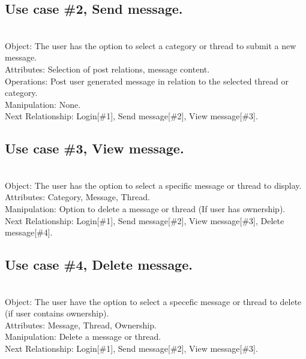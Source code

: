 \subsection{Use case \#2, Send message.}\\
Object: The user has the option to select a category or thread to submit a new message.\\
Attributes: Selection of post relations, message content.\\
Operations: Post user generated message in relation to the selected thread or category.\\
Manipulation: None.\\
Next Relationship: Login[\#1], Send message[\#2], View message[\#3].
\noindent
\subsection{Use case \#3, View message.}\\
Object: The user has the option to select a specific message or thread to display.\\
Attributes: Category, Message, Thread.\\
Manipulation: Option to delete a message or thread (If user has ownership).\\
Next Relationship: Login[\#1], Send message[\#2], View message[\#3], Delete message[\#4].
\noindent
\subsection{Use case \#4, Delete message.}\\
Object: The user have the option to select a specefic message or thread to delete (if user contains ownership).\\
Attributes: Message, Thread, Ownership.\\
Manipulation: Delete a message or thread.\\
Next Relationship: Login[\#1], Send message[\#2], View message[\#3].